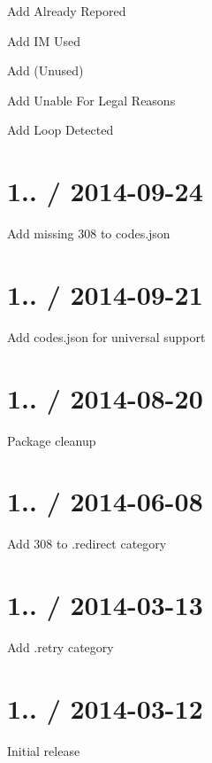 \begin{DoxyItemize}
\item Add { Already Repored}
\item Add { IM Used}
\item Add { (Unused)}
\item Add { Unable For Legal Reasons}
\item Add { Loop Detected}
\end{DoxyItemize}

\section*{1.. / 2014-\/09-\/24 }


\begin{DoxyItemize}
\item Add missing 308 to {\ttfamily codes.\+json}
\end{DoxyItemize}

\section*{1.. / 2014-\/09-\/21 }


\begin{DoxyItemize}
\item Add {\ttfamily codes.\+json} for universal support
\end{DoxyItemize}

\section*{1.. / 2014-\/08-\/20 }


\begin{DoxyItemize}
\item Package cleanup
\end{DoxyItemize}

\section*{1.. / 2014-\/06-\/08 }


\begin{DoxyItemize}
\item Add 308 to {\ttfamily .redirect} category
\end{DoxyItemize}

\section*{1.. / 2014-\/03-\/13 }


\begin{DoxyItemize}
\item Add {\ttfamily .retry} category
\end{DoxyItemize}

\section*{1.. / 2014-\/03-\/12 }


\begin{DoxyItemize}
\item Initial release 
\end{DoxyItemize}